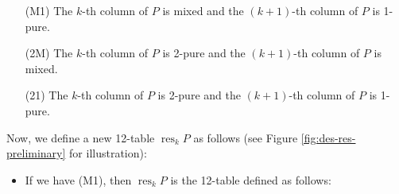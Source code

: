 \documentclass[12pt]{article}
\theoremstyle{plain}
\theoremstyle{definition}
\begin{document}
\begin{itemize}
\item[(M1)] The $k$-th column of $P$ is mixed and the $\left(  k+1\right)  $-th column of $P$ is 1-pure.

\item[(2M)] The $k$-th column of $P$ is 2-pure and the $\left(  k+1\right)  $-th column of $P$ is mixed.

\item[(21)] The $k$-th column of $P$ is 2-pure and the $\left(  k+1\right)  $-th column of $P$ is 1-pure.
\end{itemize}

Now, we define a new 12-table $\operatorname*{res}\nolimits_{k}P$ as follows (see Figure \ref{fig:des-res-preliminary} for illustration):

\begin{itemize}
\item If we have (M1), then $\operatorname*{res}_{k}P$ is the
12-table defined as follows:

\end{itemize}
\end{document}
